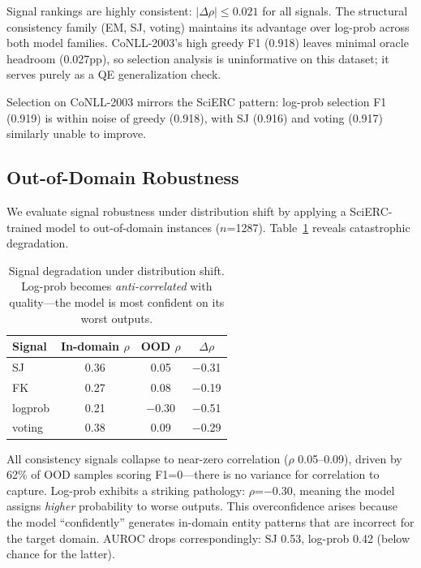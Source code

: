\documentclass[11pt,a4paper]{article}
\begin{document}
Signal rankings are highly consistent: $|\Delta\rho| \leq 0.021$ for all signals. The structural consistency family (EM, SJ, voting) maintains its advantage over log-prob across both model families. CoNLL-2003's high greedy F1 (0.918) leaves minimal oracle headroom (0.027pp), so selection analysis is uninformative on this dataset; it serves purely as a QE generalization check.

Selection on CoNLL-2003 mirrors the SciERC pattern: log-prob selection F1 (0.919) is within noise of greedy (0.918), with SJ (0.916) and voting (0.917) similarly unable to improve.

\subsection{Out-of-Domain Robustness}
\label{sec:ood}

We evaluate signal robustness under distribution shift by applying a SciERC-trained model to out-of-domain instances ($n$=1287). Table~\ref{tab:ood} reveals catastrophic degradation.

\begin{table}[t]
\centering
\small
\begin{tabular}{l cc c}
\toprule
\textbf{Signal} & \textbf{In-domain} $\rho$ & \textbf{OOD} $\rho$ & $\Delta\rho$ \\
\midrule
SJ         & 0.36 & 0.05 & $-$0.31 \\
FK         & 0.27 & 0.08 & $-$0.19 \\
logprob    & 0.21 & $-$0.30 & $-$0.51 \\
voting     & 0.38 & 0.09 & $-$0.29 \\
\bottomrule
\end{tabular}
\caption{Signal degradation under distribution shift. Log-prob becomes \emph{anti-correlated} with quality---the model is most confident on its worst outputs.}
\label{tab:ood}
\end{table}

All consistency signals collapse to near-zero correlation ($\rho$ 0.05--0.09), driven by 62\% of OOD samples scoring F1=0---there is no variance for correlation to capture. Log-prob exhibits a striking pathology: $\rho$=$-$0.30, meaning the model assigns \emph{higher} probability to worse outputs. This overconfidence arises because the model ``confidently'' generates in-domain entity patterns that are incorrect for the target domain. AUROC drops correspondingly: SJ 0.53, log-prob 0.42 (below chance for the latter).
\end{document}
